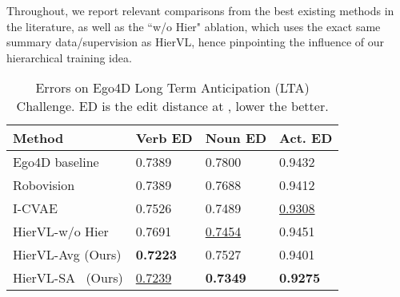 \documentclass[10pt,twocolumn,letterpaper]{article}
\newcommand{\modelname}[0]{{HierVL}}
\begin{document}
Throughout, we report relevant comparisons from the best existing methods in the literature, as well as the ``w/o Hier" ablation, which uses the exact same summary data/supervision as \modelname, hence pinpointing the influence of our hierarchical training idea. 






{
 \setlength{\tabcolsep}{1pt}
 \setlength{\extrarowheight}{1.5pt}
\begin{table}[t]\footnotesize
\begin{center}
\begin{tabular}{ L{3.0cm}||C{1.6cm}|C{1.6cm}|C{1.6cm}  }

 \hline
 Method& Verb ED  & Noun ED  & Act. ED  \\
 \hline
 Ego4D baseline \cite{ego4d}   &  0.7389   & 0.7800 & 0.9432 \\
  Robovision \cite{lta-srijan}   &  0.7389   & 0.7688 & 0.9412 \\
  I-CVAE \cite{intention}   &  0.7526   & 0.7489 & \underline{0.9308} \\
 \modelname-w/o Hier & 0.7691 & \underline{0.7454} & 0.9451\\
\modelname-Avg (Ours) & \textbf{0.7223} & 0.7527 & 0.9401 \\
 \modelname-SA ~(Ours)& \underline{0.7239} & \textbf{0.7349} & \textbf{0.9275} \\
 \hline
\end{tabular}

\end{center}
\vspace{-0.2in}
\caption{Errors on Ego4D Long Term Anticipation (LTA) Challenge. ED is the edit distance at , lower the better.}
\label{tab:lta}
\vspace{-3mm}
\end{table}

} 
\end{document}
